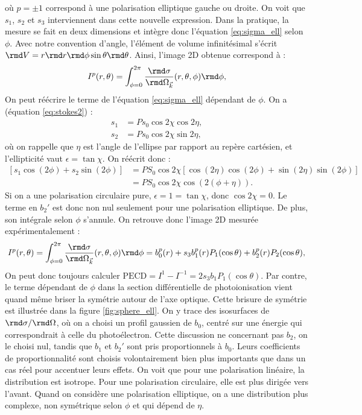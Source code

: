 où $p=\pm1$ correspond à une polarisation elliptique gauche ou droite. On voit que $s_1$, $s_2$ et $s_3$ interviennent dans cette nouvelle expression. Dans la pratique, la mesure se fait en deux dimensions et intègre donc l'équation \ref{eq:sigma_ell} selon $\phi$. Avec notre convention d'angle, l'élément de volume infinitésimal s'écrit $\rmd V = r\rmd r \rmd \phi \sin\theta \rmd \theta$. Ainsi, l'image 2D obtenue correspond à :
\begin{equation*}
I^p(r,\theta) = \int_{\phi=0}^{2\pi}\frac{\rmd\sigma}{\rmd\Omega_{\vec{k}}}(r,\theta,\phi)\rmd\phi,
\end{equation*}
On peut réécrire le terme de l'équation \ref{eq:sigma_ell} dépendant de $\phi$. On a (équation \ref{eq:stokes2}) :
\begin{align*}
s_1 &= Ps_0\cos 2\chi\cos 2\eta ,\\
s_2 &= Ps_0\cos 2\chi\sin 2\eta,
\end{align*}
où on rappelle que $\eta$ est l'angle de l'ellipse par rapport au repère cartésien, et l'ellipticité vaut $\epsilon=\tan\chi$. On réécrit donc :
\begin{align*}
\left[s_1\cos(2\phi)+s_2\sin(2\phi)\right] &= PS_0\cos 2\chi\left[\cos(2\eta)\cos(2\phi)+\sin(2\eta)\sin(2\phi)\right]\\
&= PS_0\cos 2\chi \cos(2(\phi+\eta)).
\end{align*}
Si on a une polarisation circulaire pure, $\epsilon = 1 = \tan\chi$, donc $\cos2\chi = 0$. Le terme en $b_2'$ est donc non nul seulement pour une polarisation elliptique. De plus, son intégrale selon $\phi$ s'annule. On retrouve donc l'image 2D mesurée expérimentalement :
\begin{equation*}
I^p(r,\theta) = \int_{\phi=0}^{2\pi}\frac{\rmd\sigma}{\rmd\Omega_{\vec{k}}}(r,\theta,\phi)\rmd\phi = b_0^p(r)+s_3b_1^p(r)P_1(\cos\theta)+b_2^p(r)P_2(\cos\theta),
\end{equation*}
On peut donc toujours calculer $\text{PECD} = I^1-I^{-1} = 2s_3b_1P_1(\cos\theta)$. Par contre, le terme dépendant de $\phi$ dans la section différentielle de photoionisation vient quand même briser la symétrie autour de l'axe optique. Cette brisure de symétrie est illustrée dans la figure \ref{fig:sphere_ell}. On y trace des isosurfaces de $\rmd\sigma/\rmd\Omega$, où on a choisi un profil gaussien de $b_0$, centré sur une énergie qui correspondrait à celle du photoélectron. Cette discussion ne concernant pas $b_2$, on le choisi nul, tandis que $b_1$ et $b_2'$ sont pris proportionnels à $b_0$. Leurs coefficients de proportionnalité sont choisis volontairement bien plus importants que dans un cas réel pour accentuer leurs effets. On voit que pour une polarisation linéaire, la distribution est isotrope. Pour une polarisation circulaire, elle est plus dirigée vers l'avant. Quand on considère une polarisation elliptique, on a une distribution plus complexe, non symétrique selon $\phi$ et qui dépend de $\eta$.

